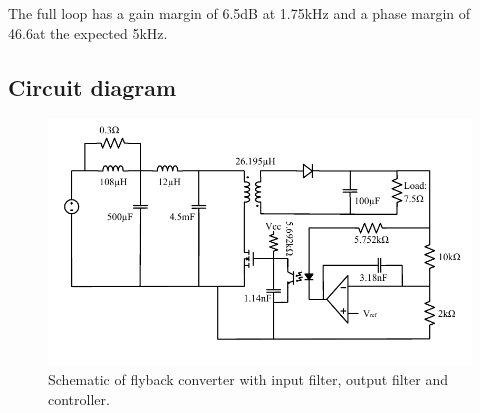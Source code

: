 The full loop has a gain margin of 6.5dB at 1.75kHz and a phase margin of 46.6\degree at the expected 5kHz.

\subsection{Circuit diagram}
\begin{figure}[H]
    \centering
    \includegraphics[width=\linewidth]{report_final/Pictures/schematic.pdf}
    \caption{Schematic of flyback converter with input filter, output filter and controller.}
    \label{fig:sch}
\end{figure}